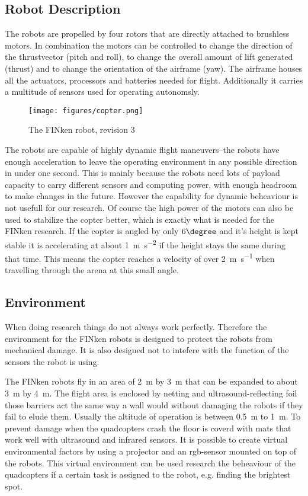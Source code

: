 \subsection{Robot Description}

The robots are propelled by four rotors that are directly attached to brushless motors.
In combination the motors can be controlled to change the direction of the thrustvector (pitch and roll), to change the overall amount of lift generated (thrust) and to change the orientation of the airframe (yaw).
The airframe houses all the actuators, processors and batteries needed for flight.
Additionally it carries a multitude of sensors used for operating autonomsly.

\begin{figure}[H]
	\centering
\texttt{[image: figures/copter.png]}
\label{copterfoto}
\caption{The FINken robot, revision 3}
\end{figure}

The robots are capable of highly dynamic flight maneuvers–the robots have enough acceleration to leave the operating environment in any possible direction in under one second.
This is mainly because the robots need lots of payload capacity to carry different sensors and computing power, with enough headroom to make changes in the future.
However the capability for dynamic beheaviour is not usefull for our research.
Of course the high power of the motors can also be used to stabilize the copter better, which is exactly what is needed for the FINken research.
If the copter is angled by only $6\degree$ and it's height is kept stable it is accelerating at about \SI{1}{\metre\per\square\second} if the height stays the same during that time.
This means the copter reaches a velocity of over \SI{2}{\metre\per\second} when travelling through the arena at this small angle. 

\subsection{Environment}
When doing research things do not always work perfectly.
Therefore the environment for the FINken robots is designed to protect the robots from mechanical damage.
It is also designed not to intefere with the function of the sensors the robot is using. 

The FINken robots fly in an area of \SI{2}{\metre} by \SI{3}{\metre} that can be expanded to about \SI{3}{\metre} by \SI{4}{\metre}.
The flight area is enclosed by netting and ultrasound-reflecting foil those barriers act the same way a wall would without damaging the robots if they fail to elude them.
Usually the altitude of operation is between \SI{0.5}{\metre} to \SI{1}{\metre}.
To prevent damage when the quadcopters crash the floor is coverd with mats that work well with ultrasound and infrared sensors.
It is possible to create virtual environmental factors by using a projector and an rgb-sensor mounted on top of the robots.
This virtual environment can be used research the beheaviour of the quadcopters if a certain task is assigned to the robot, e.g. finding the brightest spot.


